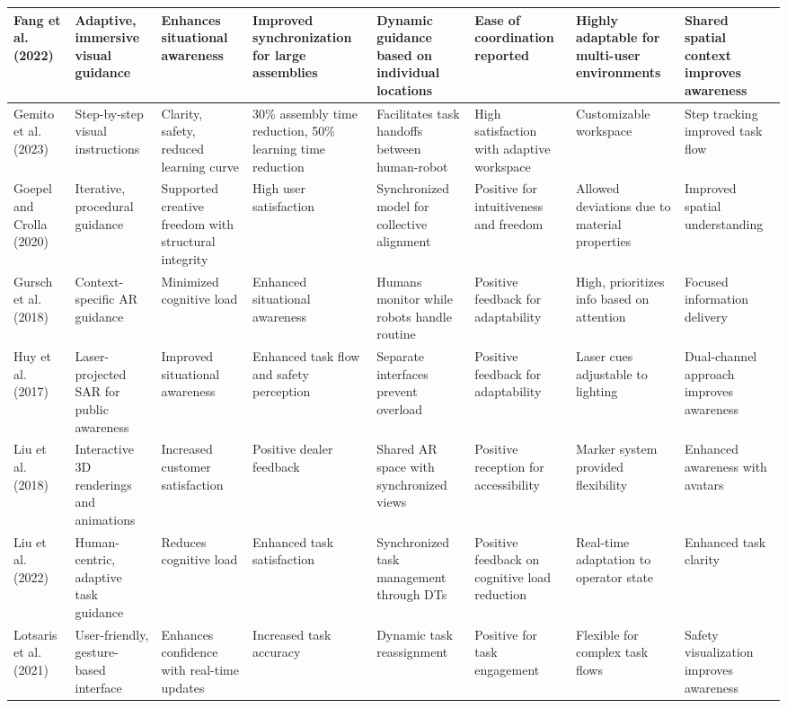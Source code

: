 {\begin{landscape}
\begin{longtable}{@{}p{1.8cm}p{1.8cm}p{1.8cm}p{1.8cm}p{1.8cm}p{1.8cm}p{1.8cm}p{1.8cm}@{}}
\midrule
Fang et al. (2022) & Adaptive, immersive visual guidance & Enhances situational awareness & Improved synchronization for large assemblies & Dynamic guidance based on individual locations & Ease of coordination reported & Highly adaptable for multi-user environments & Shared spatial context improves awareness \\
\midrule
Gemito et al. (2023) & Step-by-step visual instructions & Clarity, safety, reduced learning curve & 30\% assembly time reduction, 50\% learning time reduction & Facilitates task handoffs between human-robot & High satisfaction with adaptive workspace & Customizable workspace & Step tracking improved task flow \\
\midrule
Goepel and Crolla (2020) & Iterative, procedural guidance & Supported creative freedom with structural integrity & High user satisfaction & Synchronized model for collective alignment & Positive for intuitiveness and freedom & Allowed deviations due to material properties & Improved spatial understanding \\
\midrule
Gursch et al. (2018) & Context-specific AR guidance & Minimized cognitive load & Enhanced situational awareness & Humans monitor while robots handle routine & Positive feedback for adaptability & High, prioritizes info based on attention & Focused information delivery \\
\midrule
Huy et al. (2017) & Laser-projected SAR for public awareness & Improved situational awareness & Enhanced task flow and safety perception & Separate interfaces prevent overload & Positive feedback for adaptability & Laser cues adjustable to lighting & Dual-channel approach improves awareness \\
\midrule
Liu et al. (2018) & Interactive 3D renderings and animations & Increased customer satisfaction & Positive dealer feedback & Shared AR space with synchronized views & Positive reception for accessibility & Marker system provided flexibility & Enhanced awareness with avatars \\
\midrule
Liu et al. (2022) & Human-centric, adaptive task guidance & Reduces cognitive load & Enhanced task satisfaction & Synchronized task management through DTs & Positive feedback on cognitive load reduction & Real-time adaptation to operator state & Enhanced task clarity \\
\midrule
Lotsaris et al. (2021) & User-friendly, gesture-based interface & Enhances confidence with real-time updates & Increased task accuracy & Dynamic task reassignment & Positive for task engagement & Flexible for complex task flows & Safety visualization improves awareness \\

\end{longtable}
\end{landscape}}
